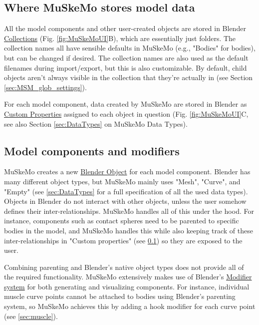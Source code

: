 \documentclass{article}
\begin{document}
\subsection{Where MuSkeMo stores model data}
\label{sec:muskemodata}
All the model components and other user-created objects are stored in Blender \href{https://docs.blender.org/manual/en/latest/scene_layout/collections/collections.html}{Collections} (Fig. \ref{fig:MuSkeMoUI}B), which are essentially just folders. The collection names all have sensible defaults in MuSkeMo (e.g., "Bodies" for bodies), but can be changed if desired. The collection names are also used as the default filenames during import/export, but this is also customizable. By default, child objects aren't always visible in the collection that they're actually in (see Section \ref{sec:MSM_glob_settings}).

For each model component, data created by MuSkeMo are stored in Blender as \href{https://docs.blender.org/manual/en/latest/files/custom_properties.html}{Custom Properties} assigned to each object in question (Fig. \ref{fig:MuSkeMoUI}C, see also Section \ref{sec:DataTypes} on MuSkeMo Data Types).

\subsection{Model components and modifiers}

MuSkeMo creates a new \href{https://docs.blender.org/manual/en/latest/scene_layout/object/types.html}{Blender Object} for each model component. Blender has many different object types, but MuSkeMo mainly uses "Mesh", "Curve", and "Empty" (see \ref{sec:DataTypes} for a full specification of all the used data types). Objects in Blender do not interact with other objects, unless the user somehow defines their inter-relationships. MuSkeMo handles all of this under the hood. For instance, components such as contact spheres need to be parented to specific bodies in the model, and MuSkeMo handles this while also keeping track of these inter-relationships in "Custom properties" (see \ref{sec:muskemodata}) so they are exposed to the user.

Combining parenting and Blender's native object types does not provide all of the required functionality. MuSkeMo extensively makes use of Blender's \href{https://docs.blender.org/manual/en/latest/modeling/modifiers/index.html}{Modifier system} for both generating and visualizing components. For instance, individual muscle curve points cannot be attached to bodies using Blender's parenting system, so MuSkeMo achieves this by adding a hook modifier for each curve point (see \ref{sec:muscle}). 
\end{document}
